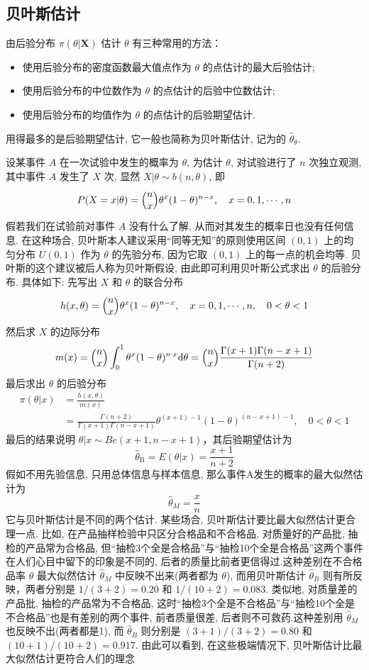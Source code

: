 \subsection{贝叶斯估计}\label{ssec:6.4.3}

由后验分布 $\pi(\theta|\boldsymbol{X})$ 估计 $\theta$ 有三种常用的方法：
\begin{itemize}
\item 使用后验分布的密度函数最大值点作为 $\theta$ 的点估计的最大后验估计;
\item 使用后验分布的中位数作为 $\theta$ 的点估计的后验中位数估计;
\item 使用后验分布的均值作为 $\theta$ 的点估计的后验期望估计.
\end{itemize}
用得最多的是后验期望估计, 它一般也简称为贝叶斯估计, 记为的 $\hat{\theta}_\theta$.

\begin{example}\label{exam:6.4.2}
设某事件 $A$ 在一次试验中发生的概率为 $\theta$, 为估计 $\theta$, 对试验进行了 $n$ 次独立观测, 其中事件 $A$ 发生了 $X$ 次, 显然 $X | \theta \sim b(n, \theta)$, 即
\[P(X=x | \theta)=\Binom nx \theta^{x}(1-\theta)^{n-x}, \quad x=0,1, \cdots, n\]
假若我们在试验前对事件 $A$ 没有什么了解, 从而对其发生的概率日也没有任何信息. 在这种场合, 贝叶斯本人建议采用“同等无知”的原则使用区间 $(0,1)$ 上的均匀分布 $U(0,1)$ 作为 $\theta$ 的先验分布, 因为它取 $(0,1)$ 上的每一点的机会均等.
贝叶斯的这个建议被后人称为贝叶斯假设, 由此即可利用贝叶斯公式求出 $\theta$ 的后验分布. 具体如下: 先写出 $X$ 和 $\theta$ 的联合分布
\[h(x, \theta)=\Binom nx \theta^{x}(1-\theta)^{n-x}, \quad x=0,1, \cdots, n, \quad 0<\theta<1\]
然后求 $X$ 的边际分布
\[m(x)=\Binom nx \int_{0}^{1} \theta^{x}(1-\theta)^{n \cdot x} \mathrm{d} \theta=\Binom nx \frac{\Gamma(x+1) \Gamma(n-x+1)}{\Gamma(n+2)}\]
最后求出 $\theta$ 的后验分布
\begin{align*} \pi(\theta | x) &=\frac{h(x, \theta)}{m(x)} \\ &=\frac{\Gamma(n+2)}{\Gamma(x+1) \Gamma(n-x+1)} \theta^{(x+1)-1}(1-\theta)^{(n-x+1)-1}, \quad 0<\theta<1 \end{align*}
最后的结果说明 $\theta | x \sim B e(x+1, n-x+1)$，其后验期望估计为
\begin{equation}\label{eq:6.4.4}
\hat{\theta}_{\mathrm{B}}=E(\theta | x)=\frac{x+1}{n+2}
\end{equation}
假如不用先验信息, 只用总体信息与样本信息, 那么事件A发生的概率的最大似然估计为
\[\hat{\theta}_{M}=\frac{x}{n}\]
它与贝叶斯估计是不同的两个估计. 某些场合, 贝叶斯估计要比最大似然估计更合理一点. 比如, 在产品抽样检验中只区分合格品和不合格品, 对质量好的产品批, 抽检的产品常为合格品, 但“抽检3个全是合格品”与“抽检10个全是合格品”这两个事件在人们心目中留下的印象是不同的, 后者的质量比前者更信得过.这种差别在不合格品率 $\theta$ 最大似然估计 $\hat{\theta}_M$ 中反映不出来(两者都为 $\theta$), 而用贝叶斯估计 $\hat{\theta}_B$ 则有所反映，两者分别是 $1/(3+2)=0.20$ 和 $1/(10+2)=0.083$. 类似地, 对质量差的产品批, 抽检的产品常为不合格品, 这时“抽检3个全是不合格品”与“抽检10个全是不合格品”也是有差别的两个事件, 前者质量很差, 后者则不可救药.这种差别用 $\hat{\theta}_M$ 也反映不出(两者都是1), 而 $\hat{\theta}_B$ 则分别是 $(3+1)/(3+2)=0.80$ 和 $(10+1)/(10+2)=0.917$. 由此可以看到, 在这些极端情况下, 贝叶斯估计比最大似然估计更符合人们的理念
\end{example}

